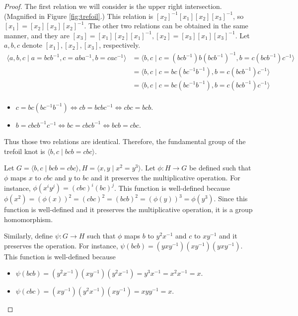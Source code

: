 \documentclass[12pt, psamsfonts]{amsart}
\theoremstyle{definition}
\theoremstyle{remark}
\numberwithin{equation}{section}
\begin{document}
\begin{proof}
  The first relation we will consider is the upper right intersection.
  (Magnified in Figure \ref{fig:trefoil}.)
  This relation is $[x_2]^{-1}[x_1][x_2][x_3]^{-1}$, so $[x_1] = [x_2][x_3][x_2]^{-1}$.
  The other two relations can be obtained in the same manner, and they are $[x_3] = [x_1][x_2][x_1]^{-1}, [x_2] = [x_3][x_1][x_3]^{-1}$.
  Let $a, b, c$ denote $[x_1], [x_2], [x_3]$, respectively.
  \begin{align*}
    \langle a, b, c \mid a = bcb^{-1}, c = aba^{-1}, b = cac^{-1} \rangle
      &= \langle b, c \mid c = (bcb^{-1})b(bcb^{-1})^{-1}, b = c(bcb^{-1})c^{-1} \rangle \\
      &= \langle b, c \mid c = bc(bc^{-1}b^{-1}), b = c(bcb^{-1})c^{-1} \rangle \\
      &= \langle b, c \mid c = bc(bc^{-1}b^{-1}), b = c(bcb^{-1})c^{-1} \rangle \\
  \end{align*}
  \begin{itemize}
    \item
      $c = bc(bc^{-1}b^{-1}) \iff cb = bcbc^{-1} \iff cbc = bcb$.
    \item
      $b = cbcb^{-1}c^{-1} \iff bc = cbcb^{-1} \iff bcb = cbc$.
  \end{itemize}
  Thus those two relations are identical.
  Therefore, the fundamental group of the trefoil knot is $\langle b, c \mid bcb = cbc \rangle$.

  Let $G = \langle b, c \mid bcb = cbc \rangle, H = \langle x, y \mid x^2 = y^3 \rangle$.
  Let $\phi: H \rightarrow G$ be defined such that $\phi$ maps $x$ to $cbc$ and $y$ to $bc$ and it preserves the multiplicative operation.
  For instance, $\phi(x^iy^j) = (cbc)^i(bc)^j$.
  This function is well-defined because $\phi(x^2) = (\phi(x))^2 = (cbc)^2 = (bcb)^2 = (\phi(y))^3 = \phi(y^3)$.
  Since this function is well-defined and it preserves the multiplicative operation, it is a group homomorphism.

  Similarly, define $\psi: G \rightarrow H$ such that $\phi$ maps $b$ to $y^2x^{-1}$ and $c$ to $xy^{-1}$ and it preserves the operation.
  For instance, $\psi(bcb) = (yxy^{-1})(xy^{-1})(yxy^{-1})$.
  This function is well-defined because
  \begin{itemize}
    \item
      $\psi(bcb) = (y^2x^{-1})(xy^{-1})(y^2x^{-1}) = y^3x^{-1} = x^2x^{-1} = x$.
    \item
      $\psi(cbc) = (xy^{-1})(y^2x^{-1})(xy^{-1}) = xyy^{-1} = x$.
  \end{itemize}


\end{proof}
\end{document}
